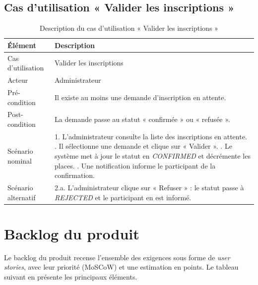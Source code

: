 \documentclass[12pt,a4paper,oneside]{report}
\begin{document}
\subsection{Cas d'utilisation « Valider les inscriptions »}
\begin{table}[H]\centering\renewcommand{\arraystretch}{1.25}
\begin{tabular}{|p{3.4cm}|p{10.3cm}|}\hline
\rowcolor{gray!15}\textbf{Élément} & \textbf{Description} \\ \hline
Cas d'utilisation & Valider les inscriptions \\ \hline
Acteur & Administrateur \\ \hline
Pré-condition & Il existe au moins une demande d'inscription en attente. \\ \hline
Post-condition & La demande passe au statut « confirmée » ou « refusée ». \\ \hline
Scénario nominal &
1. L'administrateur consulte la liste des inscriptions en attente. \newline
2. Il sélectionne une demande et clique sur « Valider ». \newline
3. Le système met à jour le statut en \textit{CONFIRMED} et décrémente les places. \newline
4. Une notification informe le participant de la confirmation. \\ \hline
Scénario alternatif &
2.a. L'administrateur clique sur « Refuser » : le statut passe à \textit{REJECTED} et le
participant en est informé. \\ \hline
\end{tabular}
\caption{Description du cas d'utilisation « Valider les inscriptions »}\label{tab:uc-val}
\end{table}

\section{Backlog du produit}
Le backlog du produit recense l'ensemble des exigences sous forme de \textit{user stories},
avec leur priorité (MoSCoW) et une estimation en points. Le tableau suivant en présente les
principaux éléments.
\end{document}
